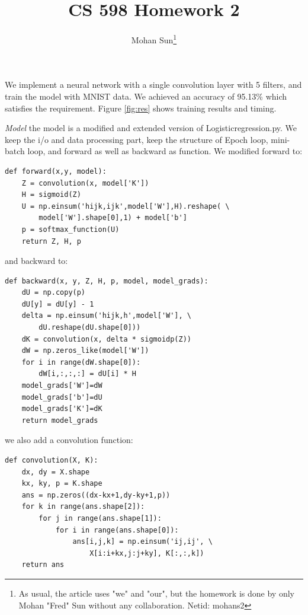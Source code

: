 \documentclass[reqno,12pt]{article}
\begin{document}
\title{\textbf{CS 598 Homework 2}}
  
\author{Mohan Sun\footnote{As usual, the article uses "we" and "our", but the homework is done
by only Mohan "Fred" Sun without any collaboration. Netid: mohans2}}

\date{\vspace{-5ex}}

\maketitle

\doublespacing

\noindent We implement a neural network with a single convolution layer with 5 filters, and train the model
with MNIST data. We achieved an accuracy of 95.13\% which satisfies the requirement. 
Figure \ref{fig:res} shows training results and timing. 

\textit{Model} the model is a modified and extended version of Logisticregression.py. We keep the 
i/o and data processing part, keep the structure of Epoch loop, mini-batch loop, and forward as well as 
backward as function. We modified forward to: 

\begin{lstlisting}
def forward(x,y, model):
    Z = convolution(x, model['K'])
    H = sigmoid(Z)
    U = np.einsum('hijk,ijk',model['W'],H).reshape( \
        model['W'].shape[0],1) + model['b']
    p = softmax_function(U)
    return Z, H, p
\end{lstlisting}

\newpage
and backward to:

\begin{lstlisting}
def backward(x, y, Z, H, p, model, model_grads):
    dU = np.copy(p)
    dU[y] = dU[y] - 1
    delta = np.einsum('hijk,h',model['W'], \
        dU.reshape(dU.shape[0]))
    dK = convolution(x, delta * sigmoidp(Z))
    dW = np.zeros_like(model['W'])
    for i in range(dW.shape[0]):
        dW[i,:,:,:] = dU[i] * H
    model_grads['W']=dW
    model_grads['b']=dU
    model_grads['K']=dK
    return model_grads
\end{lstlisting}

\newpage
we also add a convolution function:
\begin{lstlisting}
def convolution(X, K):
    dx, dy = X.shape
    kx, ky, p = K.shape
    ans = np.zeros((dx-kx+1,dy-ky+1,p))
    for k in range(ans.shape[2]):
        for j in range(ans.shape[1]):
            for i in range(ans.shape[0]):
                ans[i,j,k] = np.einsum('ij,ij', \
                    X[i:i+kx,j:j+ky], K[:,:,k])
    return ans
\end{lstlisting}
\end{document}
